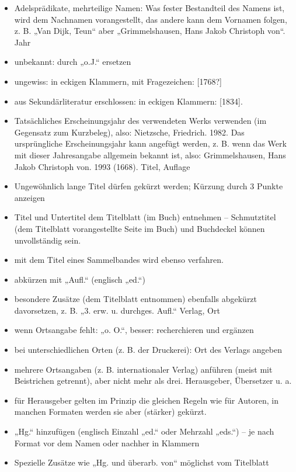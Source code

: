 \documentclass[]{book}
\theoremstyle{definition}
\theoremstyle{definition}
\theoremstyle{definition}
\theoremstyle{remark}
\begin{document}
\begin{itemize}
\item
  Adelsprädikate, mehrteilige Namen: Was fester Bestandteil des Namens
  ist, wird dem Nachnamen vorangestellt, das andere kann dem Vornamen
  folgen, z. B. „Van Dijk, Teun`` aber „Grimmelshausen, Hans Jakob
  Christoph von``. Jahr
\item
  unbekannt: durch „o.J.`` ersetzen
\item
  ungewiss: in eckigen Klammern, mit Fragezeichen: {[}1768?{]}
\item
  aus Sekundärliteratur erschlossen: in eckigen Klammern: {[}1834{]}.
\item
  Tatsächliches Erscheinungsjahr des verwendeten Werks verwenden (im
  Gegensatz zum Kurzbeleg), also: Nietzsche, Friedrich. 1982. Das
  ursprüngliche Erscheinungsjahr kann angefügt werden, z. B. wenn das
  Werk mit dieser Jahresangabe allgemein bekannt ist, also:
  Grimmelshausen, Hans Jakob Christoph von. 1993 (1668). Titel, Auflage
\item
  Ungewöhnlich lange Titel dürfen gekürzt werden; Kürzung durch 3 Punkte
  anzeigen
\item
  Titel und Untertitel dem Titelblatt (im Buch) entnehmen --
  Schmutztitel (dem Titelblatt vorangestellte Seite im Buch) und
  Buchdeckel können unvollständig sein.
\item
  mit dem Titel eines Sammelbandes wird ebenso verfahren.
\item
  abkürzen mit „Aufl.`` (englisch „ed.``)
\item
  besondere Zusätze (dem Titelblatt entnommen) ebenfalls abgekürzt
  davorsetzen, z. B. „3. erw. u. durchges. Aufl.`` Verlag, Ort
\item
  wenn Ortsangabe fehlt: „o. O.``, besser: recherchieren und ergänzen
\item
  bei unterschiedlichen Orten (z. B. der Druckerei): Ort des Verlags
  angeben
\item
  mehrere Ortsangaben (z. B. internationaler Verlag) anführen (meist mit
  Beistrichen getrennt), aber nicht mehr als drei. Herausgeber,
  Übersetzer u. a.
\item
  für Herausgeber gelten im Prinzip die gleichen Regeln wie für Autoren,
  in manchen Formaten werden sie aber (stärker) gekürzt.
\item
  „Hg.`` hinzufügen (englisch Einzahl „ed.`` oder Mehrzahl „eds.``) --
  je nach Format vor dem Namen oder nachher in Klammern
\item
  Spezielle Zusätze wie „Hg. und überarb. von`` möglichst vom Titelblatt

\end{itemize}
\end{document}
